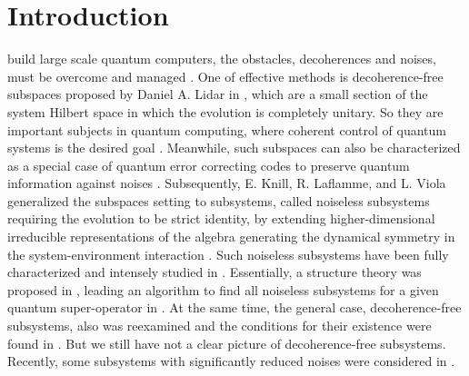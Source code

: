 \documentclass[journal]{IEEEtran}
\begin{document}
%
\IEEEpeerreviewmaketitle



\section{Introduction}
% 
% 
% 
% 
build large scale quantum computers, the obstacles, decoherences and noises,  must be overcome and managed \cite{nielsen2010quantum}. One of effective methods is 
decoherence-free subspaces proposed by Daniel A. Lidar in \cite{lidar1998decoherence}, which are a small section of the system Hilbert space in which the evolution is completely unitary. So they are important subjects in quantum computing, where coherent control of quantum systems is the desired goal \cite{lidar2012review}. Meanwhile, such subspaces can also be characterized as a special case of quantum error correcting codes to preserve quantum information against noises \cite{lidar2012review}.  Subsequently, E. Knill, R. Laflamme, and L. Viola generalized the subspaces setting to subsystems, called noiseless subsystems requiring the evolution to be strict identity, by extending higher-dimensional irreducible representations of the algebra generating the dynamical symmetry in the system-environment interaction \cite{knill2000theory}. Such noiseless subsystems have been fully characterized and intensely studied in \cite{choi2006method,blume2010information,beny2007generalization,kribs2006quantum,kribs2005unified}. Essentially, a structure theory was proposed in \cite{choi2006method}, leading  an algorithm to find all noiseless subsystems for a given quantum super-operator in \cite{knill2006protected,wang2013numerical}. At the same time, the general case, decoherence-free subsystems, also was reexamined and the conditions for their existence were found in \cite{shabani2005theory}. But we still have not a clear picture of decoherence-free subsystems. Recently, some subsystems with significantly reduced noises  were considered in \cite{wang2016minimal}.
\end{document}
